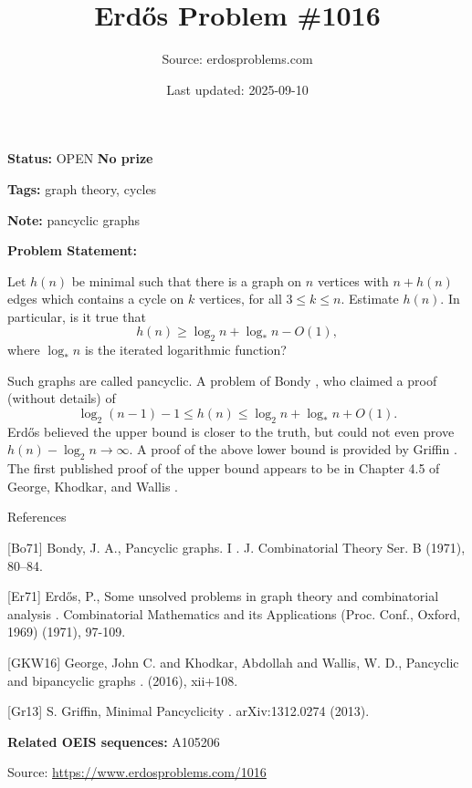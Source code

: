 \documentclass{article}
\title{Erd\H{o}s Problem \#1016}
\date{Last updated: 2025-09-10}
\author{Source: erdosproblems.com}
\begin{document}
\maketitle

\noindent\textbf{Status:} OPEN \quad \textbf{No prize}

\noindent\textbf{Tags:} graph theory, cycles

\medskip
\noindent\textbf{Note:} pancyclic graphs

\medskip

\noindent\textbf{Problem Statement:}

Let $h(n)$ be minimal such that there is a graph on $n$ vertices with $n+h(n)$ edges which contains a cycle on $k$ vertices, for all $3\leq k\leq n$. Estimate $h(n)$. In particular, is it true that\[h(n) \geq \log_2n+\log_*n-O(1),\]where $\log_*n$ is the iterated logarithmic function?




Such graphs are called pancyclic. A problem of Bondy \cite{Bo71}, who claimed a proof (without details) of\[\log_2(n-1)-1\leq h(n) \leq \log_2n+\log_*n+O(1).\]Erd\H{o}s \cite{Er71} believed the upper bound is closer to the truth, but could not even prove $h(n)-\log_2n\to \infty$. A proof of the above lower bound is provided by Griffin \cite{Gr13}. The first published proof of the upper bound appears to be in Chapter 4.5 of George, Khodkar, and Wallis \cite{GKW16}.




References

[Bo71] Bondy, J. A., Pancyclic graphs. I . J. Combinatorial Theory Ser. B (1971), 80--84.

[Er71] Erd\H{o}s, P., Some unsolved problems in graph theory and combinatorial analysis . Combinatorial Mathematics and its Applications (Proc. Conf., Oxford, 1969) (1971), 97-109.

[GKW16] George, John C. and Khodkar, Abdollah and Wallis, W. D., Pancyclic and bipancyclic graphs . (2016), xii+108.

[Gr13] S. Griffin, Minimal Pancyclicity . arXiv:1312.0274 (2013).

\noindent\textbf{Related OEIS sequences:} A105206


\bigskip
\noindent\small{Source: \url{https://www.erdosproblems.com/1016}}
\end{document}
